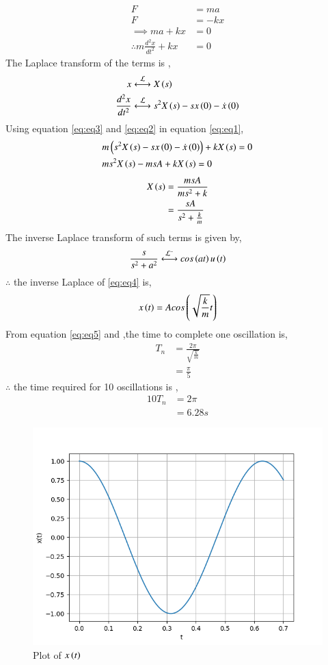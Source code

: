 \documentclass[journal,12pt,twocolumn]{IEEEtran}
\theoremstyle{remark}
\begin{document}
\solution\\

\begin{align}
    F &= ma \\
    F &= -kx \\
    \implies ma + kx &= 0\\
    \therefore m\frac{d^2x}{dt^2} + kx &= 0\label{eq:eq1}
\end{align}
The Laplace transform of the terms is ,
\begin{align}
    x & \system{\mathcal{L}} X\brak{s}\label{eq:eq3}\\
    \frac{d^2x}{dt^2} & \system{\mathcal{L}} s^2 X\brak{s} - sx\brak{0} - \dot{x}\brak{0}\label{eq:eq2}
\end{align}
Using equation \eqref{eq:eq3} and \eqref{eq:eq2} in equation \eqref{eq:eq1},
\begin{align}
    &m\left(s^2 X\left(s\right) - sx\left(0\right) - \dot{x}\left(0\right)\right) + kX\left(s\right) = 0\\
    &ms^2X\left(s\right) -msA + kX\left(s\right) = 0
\end{align}
\begin{align}
    X\left(s\right) &= \frac{msA}{ms^2 + k} \\
     &= \frac{sA}{s^2 + \frac{k}{m}} \label{eq:eq4}
\end{align}
The inverse Laplace transform of such terms is given by,
\begin{align}
    \frac{s}{s^2 + a^2} \system{\mathcal{L^{ -}}} cos\brak{at}u\brak{t}
\end{align}
$\therefore$ the inverse Laplace of \eqref{eq:eq4} is,
\begin{align}
    x\left(t\right) = Acos\left(\sqrt{\frac{k}{m}}t\right) \label{eq:eq5}
\end{align}
From equation \eqref{eq:eq5} and  ,the time to complete one oscillation is,
\begin{align}
    T_n &= \frac{2\pi}{\sqrt{\frac{k}{m}}}\\
    &= \frac{\pi}{5}\label{eq:eq6}
\end{align}
$\therefore$ the time required for 10 oscillations is ,
\begin{align}
    10T_n &= 2\pi\\
    &= 6.28 s
\end{align}
\begin{figure}[!ht]
\centering
\begin{center}
\includegraphics[width=\columnwidth]{Figure_1}
\end{center}
\caption{Plot of $x\left(t\right)$}
\end{figure}
\end{document}
